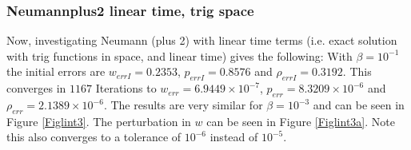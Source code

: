 \documentclass[11pt, a4paper]{article}
\theoremstyle{definition}
\begin{document}
\subsubsection*{Neumannplus2 linear time, trig space}
Now, investigating Neumann (plus 2) with linear time terms (i.e. exact solution with trig functions in space, and linear time) gives the following: With $\beta=10^{-1}$ the initial errors are $w_{errI} = 0.2353$, $p_{errI} = 0.8576$ and $\rho_{errI}=0.3192$. This converges in $1167$ Iterations to $w_{err}=6.9449 \times 10^{-7}$, $p_{err}= 8.3209 \times 10^{-6}$ and $\rho_{err}= 2.1389 \times 10^{-6}$. The results are very similar for $\beta=10^{-3}$ and can be seen in Figure \ref{Figlint3}. The perturbation in $w$ can be seen in Figure \ref{Figlint3a}. Note this also converges to  a tolerance of $10^{-6}$ instead of $10^{-5}$.\\
\end{document}
